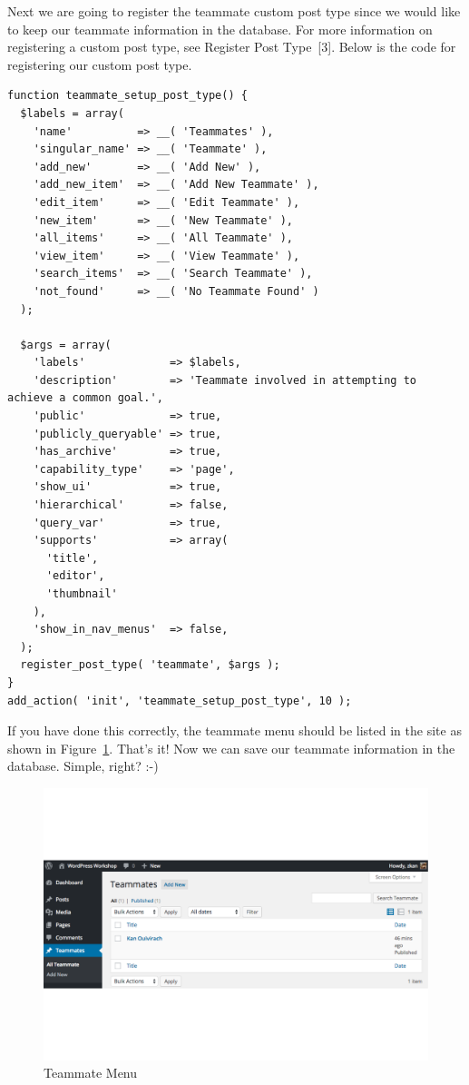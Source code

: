 \documentclass{article}
\begin{document}
\noindent Next we are going to register the teammate custom post type since we
would like to keep our teammate information in the database. For more
information on registering a custom post type, see Register Post Type~[3].
Below is the code for registering our custom post type.

\begin{verbatim}
function teammate_setup_post_type() {
  $labels = array(
    'name'          => __( 'Teammates' ),
    'singular_name' => __( 'Teammate' ),
    'add_new'       => __( 'Add New' ),
    'add_new_item'  => __( 'Add New Teammate' ),
    'edit_item'     => __( 'Edit Teammate' ),
    'new_item'      => __( 'New Teammate' ),
    'all_items'     => __( 'All Teammate' ),
    'view_item'     => __( 'View Teammate' ),
    'search_items'  => __( 'Search Teammate' ),
    'not_found'     => __( 'No Teammate Found' )
  );

  $args = array(
    'labels'             => $labels,
    'description'        => 'Teammate involved in attempting to achieve a common goal.',
    'public'             => true,
    'publicly_queryable' => true,
    'has_archive'        => true,
    'capability_type'    => 'page',
    'show_ui'            => true,
    'hierarchical'       => false,
    'query_var'          => true,
    'supports'           => array(
      'title',
      'editor',
      'thumbnail'
    ),
    'show_in_nav_menus'  => false,
  );
  register_post_type( 'teammate', $args );
}
add_action( 'init', 'teammate_setup_post_type', 10 );
\end{verbatim}

\noindent If you have done this correctly, the teammate menu should be listed
in the site as shown in Figure~\ref{fig:teammate-menu}. That's it! Now we can
save our teammate information in the database. Simple, right? :-) \\

\begin{figure}[t]
    \centering
    \includegraphics[width=6in]{figures/teammate-menu}
    \caption{Teammate Menu}
    \label{fig:teammate-menu}
\end{figure}
\end{document}
